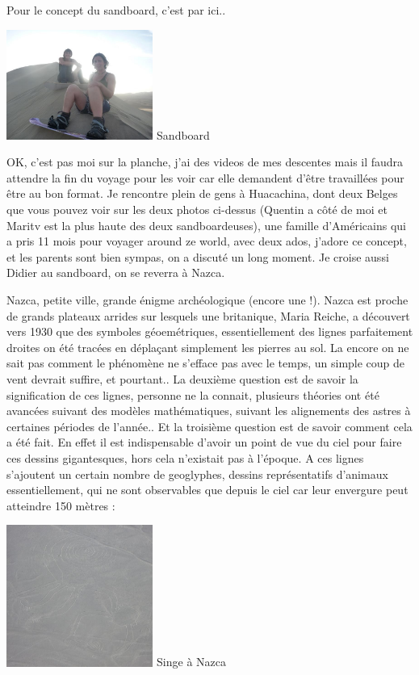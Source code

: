 \begin{multicols}{2}
Pour le concept du sandboard, c'est par ici..

\hspace*{-0.65cm}
\includegraphics[width=4.8cm]{articles/Cote-du-sud/1255997499n41M.jpg}
Sandboard


OK, c'est pas moi sur la planche, j'ai des videos de mes descentes mais il faudra attendre la fin du voyage pour les voir car elle demandent d'être travaillées pour être au bon format. Je rencontre plein de gens à Huacachina, dont deux Belges que vous pouvez voir sur les deux photos ci-dessus (Quentin a côté de moi et Maritv est la plus haute des deux sandboardeuses), une famille d'Américains qui a pris 11 mois pour voyager around ze world, avec deux ados, j'adore ce concept, et les parents sont bien sympas, on a discuté un long moment. Je croise aussi Didier au sandboard, on se reverra à Nazca.

Nazca, petite ville, grande énigme archéologique (encore une !). Nazca est proche de grands plateaux arrides sur lesquels une britanique, Maria Reiche, a découvert vers 1930 que des symboles géoemétriques, essentiellement des lignes parfaitement droites on été tracées en déplaçant simplement les pierres au sol. La encore on ne sait pas comment le phénomène ne s'efface pas avec le temps, un simple coup de vent devrait suffire, et pourtant.. La deuxième question est de savoir la signification de ces lignes, personne ne la connait, plusieurs théories ont été avancées suivant des modèles mathématiques, suivant les alignements des astres à certaines périodes de l'année.. Et la troisième question est de savoir comment cela a été fait. En effet il est indispensable d'avoir un point de vue du ciel pour faire ces dessins gigantesques, hors cela n'existait pas à l'époque. A ces lignes s'ajoutent un certain nombre de geoglyphes, dessins représentatifs d'animaux essentiellement, qui ne sont observables que depuis le ciel car leur envergure peut atteindre 150 mètres :

\hspace*{-0.65cm}
\includegraphics[width=4.8cm]{articles/Cote-du-sud/1255996049EeEt.jpg}
Singe à Nazca


\end{multicols}
